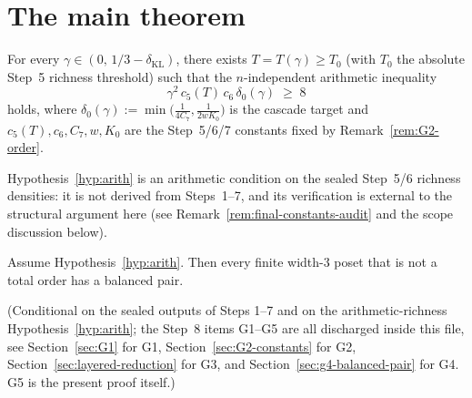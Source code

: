 \section{The main theorem}
\label{sec:main-thm}

\begin{hypothesis}\label{hyp:arith}
For every $\gamma \in (0,\, 1/3 - \delta_{\mathrm{KL}})$, there exists
$T = T(\gamma) \ge T_0$ (with $T_0$ the absolute Step~5 richness
threshold) such that the $n$-independent arithmetic inequality
\[
  \gamma^2\, c_5(T)\, c_6\, \delta_0(\gamma) \;\ge\; 8
\]
holds, where $\delta_0(\gamma) :=
\min\!\big(\tfrac{1}{4C_7},\tfrac{1}{2wK_0}\big)$ is the cascade
target and $c_5(T), c_6, C_7, w, K_0$ are the Step~5/6/7
constants fixed by Remark~\ref{rem:G2-order}.
\end{hypothesis}

\noindent
Hypothesis~\ref{hyp:arith} is an arithmetic condition on the
sealed Step~5/6 richness densities: it is not derived from
Steps~1--7, and its verification is external to the structural
argument here (see Remark~\ref{rem:final-constants-audit} and the
scope discussion below).

\begin{theorem}
\label{thm:main-step8}
Assume Hypothesis~\ref{hyp:arith}. Then every finite width-$3$ poset
that is not a total order has a balanced pair.
\end{theorem}

\noindent
(Conditional on the sealed outputs of Steps 1--7 and on the
arithmetic-richness Hypothesis~\ref{hyp:arith}; the Step~8
items G1--G5 are all discharged inside this file, see
Section~\ref{sec:G1} for G1, Section~\ref{sec:G2-constants} for G2,
Section~\ref{sec:layered-reduction} for G3, and
Section~\ref{sec:g4-balanced-pair} for G4. G5 is the present proof
itself.)

